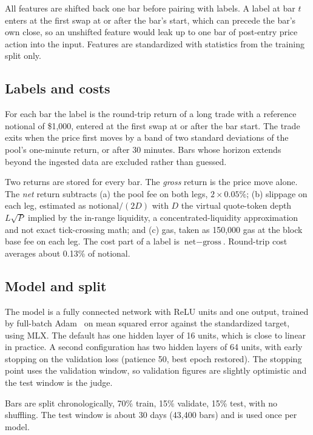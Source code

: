 \documentclass[11pt,a4paper]{article}
\begin{document}
All features are shifted back one bar before pairing with labels. A label at
bar $t$ enters at the first swap at or after the bar's start, which can
precede the bar's own close, so an unshifted feature would leak up to one bar
of post-entry price action into the input. Features are standardized with
statistics from the training split only.

\subsection{Labels and costs}

For each bar the label is the round-trip return of a long trade with a
reference notional of \$1,000, entered at the first swap at or after the bar
start. The trade exits when the price first moves by a band of two standard
deviations of the pool's one-minute return, or after 30 minutes. Bars whose
horizon extends beyond the ingested data are excluded rather than guessed.

Two returns are stored for every bar. The \emph{gross} return is the price
move alone. The \emph{net} return subtracts (a) the pool fee on both legs,
$2\times 0.05\%$; (b) slippage on each leg, estimated as
$\text{notional}/(2D)$ with $D$ the virtual quote-token depth
$L\sqrt{P}$ implied by the in-range liquidity, a concentrated-liquidity
approximation and not exact tick-crossing math; and (c) gas, taken as 150,000
gas at the block base fee on each leg. The cost part of a label is
$\text{net}-\text{gross}$. Round-trip cost averages about 0.13\% of notional.

\subsection{Model and split}

The model is a fully connected network with ReLU units and one output,
trained by full-batch Adam~\cite{kingma2015} on mean squared error against
the standardized target, using MLX. The default has one hidden layer of 16
units, which is close to linear in practice. A second configuration has two
hidden layers of 64 units, with early stopping on the validation loss
(patience 50, best epoch restored). The stopping point uses the validation
window, so validation figures are slightly optimistic and the test window is
the judge.

Bars are split chronologically, 70\% train, 15\% validate, 15\% test, with no
shuffling. The test window is about 30 days (43,400 bars) and is used once
per model.
\end{document}
